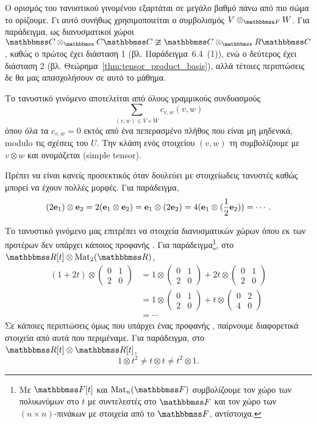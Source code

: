 \documentclass[12pt,a4paper,reqno]{amsart}
\newcommand{\defn}[1]{{\color{mylightblue}{#1}}}
\begin{document}
\begin{remark}
    Ο ορισμός του τανυστικού γινομένου εξαρτάται σε μεγάλο βαθμό πάνω από πιο σώμα το ορίζουμε. Γι αυτό συνήθως χρησιμοποιείται ο συμβολισμός $V\otimes_{\FF}W$. Για παράδειγμα, ως διανυσματικοί χώροι $\CC\otimes_\CC\CC \ncong \CC\otimes_\RR\CC$, καθώς ο πρώτος έχει διάσταση 1 (βλ. Παράδειγμα~6.4~(1)), ενώ ο δεύτερος έχει διάσταση 2 (βλ. Θεώρημα~\ref{thm:tensor_product_basis}), αλλά τέτοιες περιπτώσεις δε θα μας απασχολήσουν σε αυτό το μάθημα.
\end{remark}

Το τανυστικό γινόμενο αποτελείται από όλους γραμμικούς συνδυασμούς 
\[
\sum_{(v,w) \in V\times W} c_{v,w}(v,w)
\]
όπου όλα τα $c_{v,w}=0$ εκτός από ένα πεπερασμένο πλήθος που είναι μη μηδενικά, modulo τις σχέσεις του $U$. Την κλάση ενός στοιχείου $(v,w)$ τη συμβολίζουμε με $v \otimes w$ και ονομάζεται \defn{στοιχειώδης τανυστής} (simple tensor).

Πρέπει να είναι κανείς προσεκτικός όταν δουλεύει με στοιχείωδεις τανυστές καθώς μπορεί να έχουν πολλές  μορφές. Για παράδειγμα, 
\[
(2\mathbf{e}_1) \otimes \mathbf{e}_2 = 2(\mathbf{e}_1 \otimes \mathbf{e}_2) = \mathbf{e}_1 \otimes (2\mathbf{e}_2) = 4(\mathbf{e}_1 \otimes (\frac{1}{2}\mathbf{e}_2)) = \cdots. 
\]

Το τανυστικό γινόμενο μας επιτρέπει να  στοιχεία διανυσματικών χώρων όπου εκ των προτέρων δεν υπάρχει κάποιος προφανής . Για παράδειγμα\footnote{Με $\FF[t]$ και $\rmMat_n(\FF)$ συμβολίζουμε τον χώρο των πολυωνύμων στο $t$ με συντελεστές στο $\FF$ και τον χώρο των $(n\times n)$-πινάκων με στοιχεία από το $\FF$, αντίστοιχα.}, στο $\RR[t] \otimes \rmMat_2(\RR)$,
\begin{align*}
(1 + 2t) \otimes \begin{pmatrix}
    0 & 1 \\
    2 & 0 
\end{pmatrix} &= 
1 \otimes \begin{pmatrix}
    0 & 1 \\
    2 & 0 
\end{pmatrix} + 2t \otimes \begin{pmatrix}
    0 & 1 \\
    2 & 0 
\end{pmatrix} \\ 
&= 
1 \otimes \begin{pmatrix}
    0 & 1 \\
    2 & 0 
\end{pmatrix} + t \otimes \begin{pmatrix}
    0 & 2 \\
    4 & 0 
\end{pmatrix} \\
&= \cdots 
\end{align*}
Σε κάποιες περιπτώσεις όμως που υπάρχει ένας προφανής , παίρνουμε διαφορετικά στοιχεία από αυτά που περιμέναμε. Για παράδειγμα, στο $\RR[t] \otimes \RR[t]$, 
\[
1 \otimes t^2 \neq t \otimes t \neq t^2 \otimes 1.
\]
\end{document}
